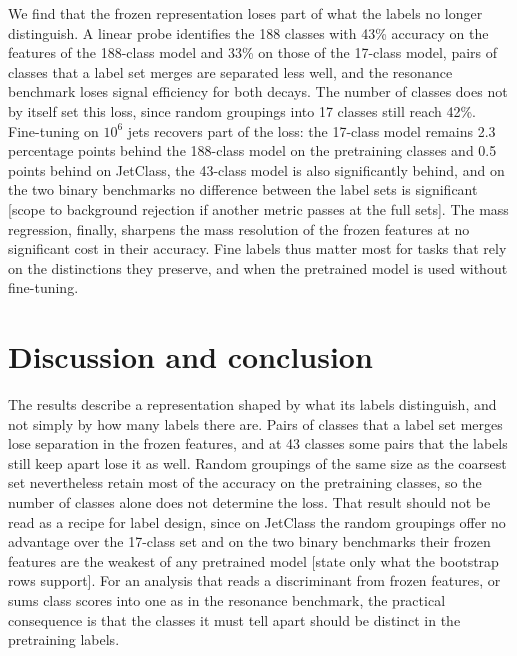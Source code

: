 \documentclass[11pt,a4paper]{article}
\newcommand{\bn}[1]{\textcolor{blue!70!black}{#1}}
\newcommand{\chk}[1]{\textcolor{red!70!black}{#1}}
\begin{document}
We find that the frozen representation loses part of what the labels no longer distinguish.
A linear probe identifies the 188 classes with \bn{43\%} accuracy on the features of the 188-class
model and \bn{33\%} on those of the 17-class model, pairs of classes that a label set merges
are separated less well, and \chk{the resonance benchmark loses signal efficiency for both
decays}.
The number of classes does not by itself set this loss, since random groupings into 17 classes
still reach \bn{42\%}.
Fine-tuning on $10^6$ jets recovers part of the loss: the 17-class model remains \bn{2.3}
percentage points behind the 188-class model on the pretraining classes and \bn{0.5} points behind
on JetClass, the 43-class model is also significantly behind, and on the two binary benchmarks no
difference between the label sets is significant
\chk{[scope to background rejection if another metric passes at the full sets]}.
The mass regression, finally, sharpens the mass resolution of the frozen features at no
significant cost in their accuracy.
Fine labels thus matter most for tasks that rely on the distinctions they preserve, and when the
pretrained model is used without fine-tuning.

\section{Discussion and conclusion}

The results describe a representation shaped by what its labels distinguish, and not simply by
how many labels there are.
Pairs of classes that a label set merges lose separation in the frozen features, and at 43 classes
some pairs that the labels still keep apart lose it as well.
Random groupings of the same size as the coarsest set nevertheless retain most of the accuracy
on the pretraining classes, so the number of classes alone does not determine the loss.
That result should not be read as a recipe for label design, since on JetClass the random
groupings offer no advantage over the 17-class set
\chk{and on the two binary benchmarks their frozen features are the weakest of any pretrained
model [state only what the bootstrap rows support]}.
For an analysis that reads a discriminant from frozen features, or sums class scores into one as
in the resonance benchmark, the practical consequence is that the classes it must tell apart
should be distinct in the pretraining labels.
\end{document}
